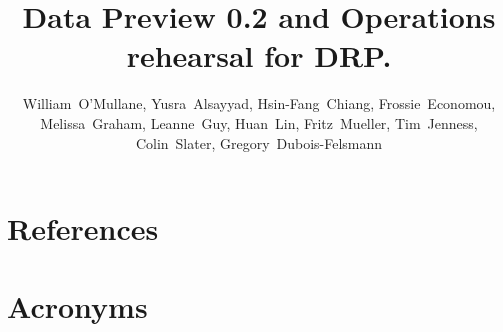 \documentclass[OPS,authoryear,toc]{lsstdoc}
\title{Data Preview 0.2 and Operations rehearsal for DRP.}
\author{%
William~O'Mullane,
Yusra~Alsayyad,
Hsin-Fang~Chiang,
Frossie~Economou,
Melissa~Graham,
Leanne~Guy,
Huan~Lin,
Fritz~Mueller,
Tim~Jenness,
Colin~Slater,
Gregory~Dubois-Felsmann
}
\date{\vcsDate}
\begin{document}
\maketitle


\appendix
\section{References} \label{sec:bib}
\renewcommand{\refname}{} %


\section{Acronyms} \label{sec:acronyms}

\end{document}
